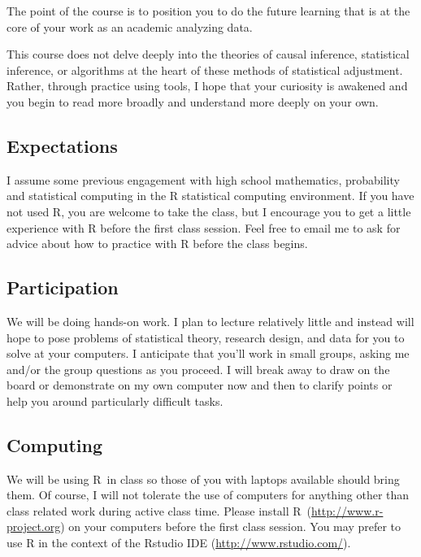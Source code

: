 \documentclass[10pt, letterpaper]{article}
\newenvironment{introstuff} {\setcounter{secnumdepth}{0}%
} {\setcounter{secnumdepth}{1}%
\restoregeometry
}
\begin{document}
\begin{introstuff}
  The point of the course is to position you to do the future learning
  that is at the core of your work as an academic analyzing data.

  This course does not delve deeply into the theories of causal
  inference, statistical inference, or algorithms at the heart of these
  methods of statistical adjustment. Rather, through practice using
  tools, I hope that your curiosity is awakened and you begin to read
  more broadly and understand more deeply on your own.

  \subsection{Expectations}

  I assume some previous engagement with high school mathematics,
  probability and statistical computing in the R statistical computing
  environment. If you have not used R, you are welcome to take the
  class, but I encourage you to get a little experience with R before
  the first class session. Feel free to email me to ask for advice about
  how to practice with R before the class begins.

  \subsection{Participation}

  We will be doing hands-on work. I plan to lecture relatively little and
  instead will hope to pose problems of statistical theory, research
  design, and data for you to solve at your computers. I anticipate that
  you'll work in small groups, asking me and/or the group questions as
  you proceed. I will break away to draw on the board or demonstrate on
  my own computer now and then to clarify points or help you around
  particularly difficult tasks.

  \subsection{Computing}

  We will be using R~in class so those of you with laptops available
  should bring them. Of course, I will not tolerate the use of computers
  for anything other than class related work during active class
  time. Please install R~(\url{http://www.r-project.org}) on your
  computers before the first class session. You may prefer to use R in the
  context of the Rstudio IDE (\url{http://www.rstudio.com/}).


\end{introstuff}
\end{document}
